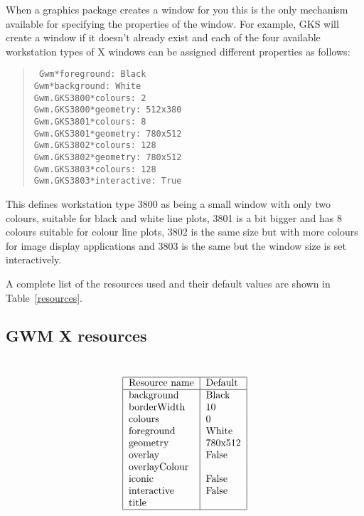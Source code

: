 \documentclass[twoside,11pt]{article}
\renewcommand{\_}{\texttt{\symbol{95}}}
\begin{document}
When a graphics package creates a window for you this is the only mechanism
available for specifying the properties of the window. For example, GKS will
create a window if it doesn't already exist and each of the four available
workstation types of X windows can be assigned different properties as follows:
\begin{quote}{\tt
Gwm*foreground: Black\\
Gwm*background: White\\
Gwm.GKS\_3800*colours: 2\\
Gwm.GKS\_3800*geometry: 512x380\\
Gwm.GKS\_3801*colours: 8\\
Gwm.GKS\_3801*geometry: 780x512\\
Gwm.GKS\_3802*colours: 128\\
Gwm.GKS\_3802*geometry: 780x512\\
Gwm.GKS\_3803*colours: 128\\
Gwm.GKS\_3803*interactive: True}
\end{quote}
This defines workstation type 3800 as being a small window with only two
colours, suitable for black and white line plots, 3801 is a bit bigger and has
8 colours suitable for colour line plots, 3802 is the same size but with more
colours for image display applications and 3803 is the same but the window size
is set interactively.

A complete list of the resources used and their default values are shown in
Table~\ref{resources}.
\begin{htmlonly}
\subsection{GWM X resources}
\end{htmlonly}
\begin{table}\caption{GWM X resources\label{resources}}\tt
\[\begin{tabular}{|l|l|}\hline
\rm Resource name &\rm Default\\ \hline
background &Black\\
borderWidth &10\\
colours & 0\\
foreground &White\\
geometry &780x512\\
overlay &False\\
overlayColour &\\
iconic &False\\
interactive &False\\
title &\\\hline
\end{tabular}\]
\end{table}
\end{document}
